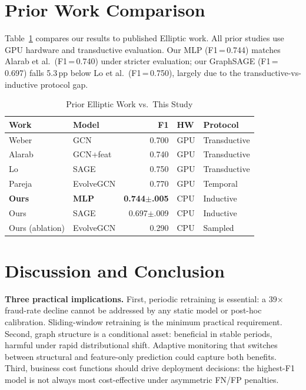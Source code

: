 \documentclass[journal,10pt,twoside]{IEEEtran}
\begin{document}
\section{Prior Work Comparison}
\label{sec:prior}

Table~\ref{tab:prior} compares our results to published Elliptic work.
All prior studies use GPU hardware and transductive evaluation. Our MLP
(F1\,=\,0.744) matches Alarab et al.\ (F1\,=\,0.740) under stricter
evaluation; our GraphSAGE (F1\,=\,0.697) falls 5.3\,pp below
Lo et al.\ (F1\,=\,0.750), largely due to the transductive-vs-inductive
protocol gap.

\begin{table}[!htbp]
\centering
\caption{Prior Elliptic Work vs.\ This Study}
\label{tab:prior}
\scriptsize
\setlength{\tabcolsep}{3pt}
\begin{tabular}{llrll}
\toprule
\textbf{Work} & \textbf{Model} & \textbf{F1}
  & \textbf{HW} & \textbf{Protocol} \\
\midrule
Weber~\cite{weber2019}    & GCN       & 0.700 & GPU & Transductive \\
Alarab~\cite{alarab2020}  & GCN+feat  & 0.740 & GPU & Transductive \\
Lo~\cite{lo2023}          & SAGE      & 0.750 & GPU & Transductive \\
Pareja~\cite{pareja2020evolvegcn} & EvolveGCN & 0.770 & GPU & Temporal \\
\midrule
\textbf{Ours} & \textbf{MLP} & \textbf{0.744$\pm$.005}
  & CPU & Inductive \\
Ours & SAGE & 0.697$\pm$.009 & CPU & Inductive \\
Ours (ablation) & EvolveGCN & 0.290 & CPU & Sampled \\
\bottomrule
\end{tabular}
\end{table}

\section{Discussion and Conclusion}
\label{sec:conclusion}

\textbf{Three practical implications.} First, periodic retraining is
essential: a 39$\times$ fraud-rate decline cannot be addressed by any
static model or post-hoc calibration. Sliding-window retraining is the
minimum practical requirement. Second, graph structure is a conditional
asset: beneficial in stable periods, harmful under rapid distributional
shift. Adaptive monitoring that switches between structural and
feature-only prediction could capture both benefits. Third, business
cost functions should drive deployment decisions: the highest-F1 model
is not always most cost-effective under asymmetric FN/FP penalties.
\end{document}
